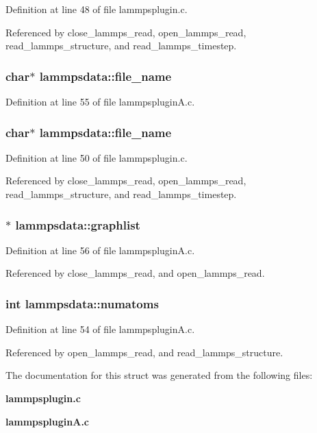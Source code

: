 Definition at line 48 of file lammpsplugin.c.

Referenced by close\_\-lammps\_\-read, open\_\-lammps\_\-read, read\_\-lammps\_\-structure, and read\_\-lammps\_\-timestep.
\subsubsection{\setlength{\rightskip}{0pt plus 5cm}char$\ast$ lammpsdata::file\_\-name}\label{structlammpsdata_m5}




Definition at line 55 of file lammpsplugin\-A.c.
\subsubsection{\setlength{\rightskip}{0pt plus 5cm}char$\ast$ lammpsdata::file\_\-name}\label{structlammpsdata_m2}




Definition at line 50 of file lammpsplugin.c.

Referenced by close\_\-lammps\_\-read, open\_\-lammps\_\-read, read\_\-lammps\_\-structure, and read\_\-lammps\_\-timestep.
\subsubsection{$\ast$ lammpsdata::graphlist}\label{structlammpsdata_m6}




Definition at line 56 of file lammpsplugin\-A.c.

Referenced by close\_\-lammps\_\-read, and open\_\-lammps\_\-read.
\subsubsection{\setlength{\rightskip}{0pt plus 5cm}int lammpsdata::numatoms}\label{structlammpsdata_m1}




Definition at line 54 of file lammpsplugin\-A.c.

Referenced by open\_\-lammps\_\-read, and read\_\-lammps\_\-structure.

The documentation for this struct was generated from the following files:\begin{CompactItemize}
\item 
{\bf lammpsplugin.c}\item 
{\bf lammpsplugin\-A.c}\end{CompactItemize}
